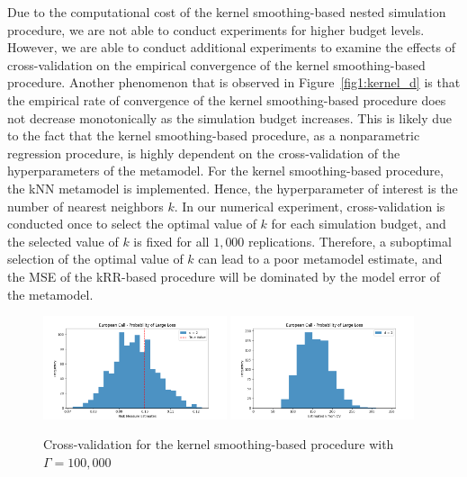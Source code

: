 Due to the computational cost of the kernel smoothing-based nested simulation procedure, we are not able to conduct experiments for higher budget levels.
However, we are able to conduct additional experiments to examine the effects of cross-validation on the empirical convergence of the kernel smoothing-based procedure.
Another phenomenon that is observed in Figure~\ref{fig1:kernel_d} is that the empirical rate of convergence of the kernel smoothing-based procedure does not decrease monotonically as the simulation budget increases.
This is likely due to the fact that the kernel smoothing-based procedure, as a nonparametric regression procedure, is highly dependent on the cross-validation of the hyperparameters of the metamodel.
For the kernel smoothing-based procedure, the kNN metamodel is implemented. 
Hence, the hyperparameter of interest is the number of nearest neighbors $k$.
In our numerical experiment, cross-validation is conducted once to select the optimal value of $k$ for each simulation budget, and the selected value of $k$ is fixed for all $1,000$ replications.
Therefore, a suboptimal selection of the optimal value of $k$ can lead to a poor metamodel estimate, and the MSE of the kRR-based procedure will be dominated by the model error of the metamodel.

\begin{figure}[ht!]
    \centering
    \includegraphics[width=0.48\textwidth]{./project1/figures/figure5a.png}
    \includegraphics[width=0.48\textwidth]{./project1/figures/figure5b.png}
    \caption{Cross-validation for the kernel smoothing-based procedure with $\Gamma=100,000$}
    \label{fig1:kernel_cv} 
\end{figure}

